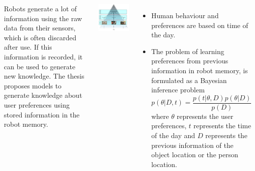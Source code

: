 \documentclass[25pt, 
               a0paper, 
               portraitmargin = 0mm, 
               margin = 0mm,
               innermargin = 50mm,
               blockverticalspace = 8mm,
               colspace = 40mm,
               subcolspace = 8mm]
               {tikzposter}
\begin{document}
\begin{columns}
    {
    Robots generate a lot of information using the raw data from their sensors,
which is often discarded after use. If this information is recorded, it can be used to generate new knowledge\cite{niemueller2012generic}. The thesis proposes models to generate knowledge about user preferences using stored information in the robot memory. 
    
    \begin{tikzfigure}
		    \includegraphics[width=0.8\linewidth]{images/dikw-pyramid.png}
	\end{tikzfigure}
    
    }
    


   
    
	{
	    \begin{itemize}
	        \item Human behaviour and preferences are based on time of the day.
	        \item The problem of learning preferences from previous information in robot memory, is formulated as a Bayesian inference problem
            \begin{equation}
	            p (\theta | D , t) = \frac{p (t | \theta , D) p (\theta | D )}{p (D)}
            \end{equation}
where $\theta$ represents the user preferences, $t$  represents the time of the day and $D$ represents the previous information of the object location or the person location.
        \end{itemize}

}
\end{columns}
\end{document}
